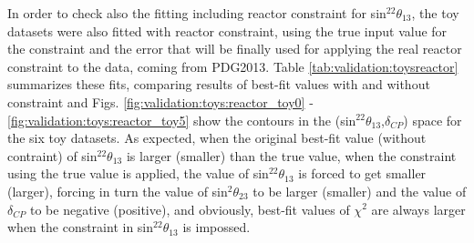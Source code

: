 In order to check also the fitting including reactor constraint for sin$^22\theta_{13}$, the toy datasets were also fitted with reactor constraint, using the true input value for the constraint and the error that will be finally used for applying the real reactor constraint to the data, coming from PDG2013. Table \ref{tab:validation:toysreactor} summarizes these fits, comparing results of best-fit values with and without constraint and Figs. \ref{fig:validation:toys:reactor_toy0} - \ref{fig:validation:toys:reactor_toy5} show the contours in the (sin$^22\theta_{13}$,$\delta_{CP}$) space for the six toy datasets. 
As expected, when the original best-fit value (without contraint) of sin$^22\theta_{13}$ is larger (smaller) than the true value, when the constraint using the true value is applied, the value of sin$^22\theta_{13}$ is forced to get smaller (larger), forcing in turn the value of sin$^2\theta_{23}$ to be larger (smaller) and the value of $\delta_{CP}$ to be negative (positive),
and obviously, best-fit values of $\chi^{2}$ are always larger when the constraint in sin$^22\theta_{13}$ is impossed. 

